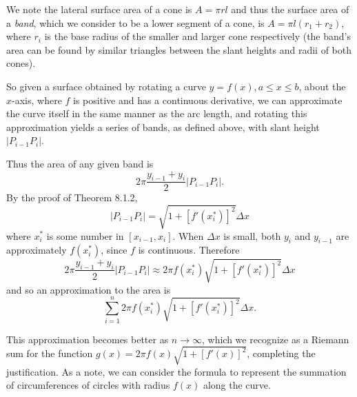\documentclass[a4paper,8pt]{article}
\begin{document}
\begin{outline}
    \pagebreak
    \begin{justification}
      We note the lateral surface area of a cone is \(A = \pi rl\) and thus the surface area of a \textit{band}, which
      we consider to be a lower segment of a cone, is \(A = \pi l(r_1+r_2)\), where \(r_i\) is the base radius of the
      smaller and larger cone respectively (the band's area can be found by similar triangles between the slant heights
      and radii of both cones).

      So given a surface obtained by rotating a curve \(y=f(x), a\leq x \leq b\), about the \(x\)-axis, where
      \(f\) is positive and has a continuous derivative, we can approximate the curve itself in the same manner
      as the arc length, and rotating this approximation yields a series of bands, as defined above, with slant
      height \(|P_{i-1}P_i|\).

      Thus the area of any given band is \[2\pi\frac{y_{i-1}+y_i}{2}|P_{i-1}P_i|\text{.}\] By the proof of Theorem 8.1.2,
      \[ |P_{i-1}P_i| = \sqrt{1+[f'(x_i^*)]^2}\Delta{x} \] where \(x_i^*\) is some number in \([x_{i-1},x_i]\). When
      \(\Delta{x}\) is small, both \(y_i\) and \(y_{i-1}\) are approximately \(f(x_i^*)\), since \(f\) is continuous.
      Therefore \[2\pi\frac{y_{i-1}+y_i}{2}|P_{i-1}P_i| \approx 2\pi f(x_i^*)\sqrt{1+[f'(x_i^*)]^2}\Delta{x}\]
      and so an approximation to the area is \[ \sum_{i=1}^n2\pi f(x_i^*)\sqrt{1+[f'(x_i^*)]^2}\Delta{x}\text{.} \]

      This approximation becomes better as \(n\rightarrow\infty\), which we recognize as a Riemann sum for the
      function \(g(x) = 2\pi f(x)\sqrt{1+[f'(x)]^2}\), completing the justification. As a note, we can consider
      the formula to represent the summation of circumferences of circles with radius \(f(x)\) along the curve.
    \end{justification}

\end{outline}
\end{document}
